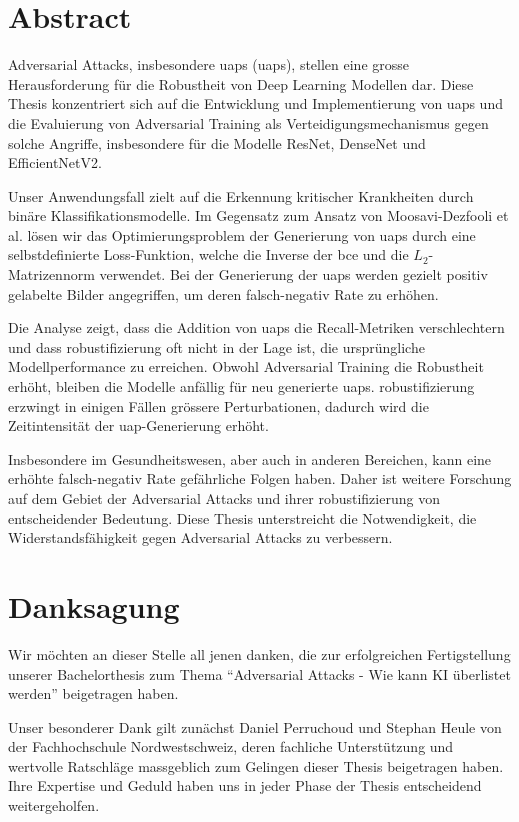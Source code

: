 \section*{Abstract} 
Adversarial Attacks, insbesondere \acrlong{uap}s (\acrshort{uap}s), stellen eine grosse Herausforderung für die Robustheit von Deep Learning Modellen dar. Diese Thesis konzentriert sich auf die Entwicklung und Implementierung von \acrshort{uap}s und die Evaluierung von Adversarial Training als Verteidigungsmechanismus gegen solche Angriffe, insbesondere für die Modelle ResNet, DenseNet und EfficientNetV2.

Unser Anwendungsfall zielt auf die Erkennung kritischer Krankheiten durch binäre Klassifikationsmodelle. Im Gegensatz zum Ansatz von Moosavi-Dezfooli et al. \cite{moosavi-dezfooli_universal_2017} lösen wir das Optimierungsproblem der Generierung von \acrshort{uap}s durch eine selbstdefinierte Loss-Funktion, welche die Inverse der \acrlong{bce} und die $L_2$-Matrizennorm verwendet. Bei der Generierung der \acrshort{uap}s werden gezielt positiv gelabelte Bilder angegriffen, um deren falsch-negativ Rate zu erhöhen.

Die Analyse zeigt, dass die Addition von \acrshort{uap}s die Recall-Metriken verschlechtern und dass \Gls{robustifizierung} oft nicht in der Lage ist, die ursprüngliche Modellperformance zu erreichen. Obwohl Adversarial Training die Robustheit erhöht, bleiben die Modelle anfällig für neu generierte \acrshort{uap}s. \Gls{robustifizierung} erzwingt in einigen Fällen grössere Perturbationen, dadurch wird die Zeitintensität der \acrshort{uap}-Generierung erhöht.

Insbesondere im Gesundheitswesen, aber auch in anderen Bereichen, kann eine erhöhte falsch-negativ Rate gefährliche Folgen haben. Daher ist weitere Forschung auf dem Gebiet der Adversarial Attacks und ihrer \Gls{robustifizierung} von entscheidender Bedeutung. Diese Thesis unterstreicht die Notwendigkeit, die Widerstandsfähigkeit gegen Adversarial Attacks zu verbessern.

\clearpage

\section*{Danksagung}
Wir möchten an dieser Stelle all jenen danken, die zur erfolgreichen Fertigstellung unserer Bachelorthesis zum Thema ``Adversarial Attacks - Wie kann KI überlistet werden'' beigetragen haben.

Unser besonderer Dank gilt zunächst Daniel Perruchoud und Stephan Heule von der Fachhochschule Nordwestschweiz, deren fachliche Unterstützung und wertvolle Ratschläge massgeblich zum Gelingen dieser Thesis beigetragen haben. Ihre Expertise und Geduld haben uns in jeder Phase der Thesis entscheidend weitergeholfen.

